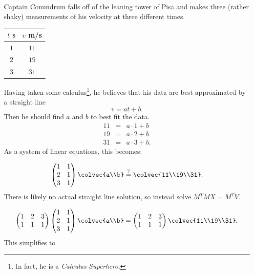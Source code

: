 \begin{example}
Captain Conundrum falls off of the leaning tower of Pisa and makes three (rather shaky) measurements of his velocity at three different times.

\begin{center}
\begin{tabular}{c|c}
$t$ s & $v $ m/s \\ \hline
$1$ & $11$ \\
$2$ & $19$ \\
$3$ & $31$
\end{tabular}
\end{center}

Having taken some calculus\footnote{In fact, he is a \emph{Calculus Superhero}.}, he believes that his data are best approximated by a straight line
\[
v = at+b.
\]
Then he should find $a$ and $b$ to best fit the data.
\begin{eqnarray*}
11 &=& a\cdot 1 + b \\
19 &=& a\cdot 2 + b \\
31 &=& a\cdot 3 + b.
\end{eqnarray*}
As a system of linear equations, this becomes:

\[
\begin{pmatrix}
1 & 1 \\
2 & 1 \\
3 & 1 \\
\end{pmatrix}
\colvec{a\\b} \stackrel{?}{=}
\colvec{11\\19\\31}.
\]
There is likely no actual straight line solution, so instead solve $M^TMX=M^TV$.

\[
\begin{pmatrix}
1 & 2 & 3 \\
1 & 1 & 1 \\
\end{pmatrix}
\begin{pmatrix}
1 & 1 \\
2 & 1 \\
3 & 1 \\
\end{pmatrix} \colvec{a\\b}
= 
\begin{pmatrix}
1 & 2 & 3 \\
1 & 1 & 1 \\
\end{pmatrix}
\colvec{11\\19\\31}.
\]
This simplifies to 


\end{example}
